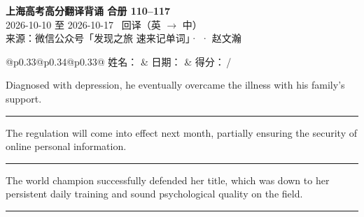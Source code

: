 \documentclass[11pt,a4paper]{article}
\newcommand{\num}[1]{\makebox[1.9em][r]{#1.}\hspace{0.3em}}
\newcommand{\wline}{\noindent\rule{\linewidth}{0.4pt}}
\begin{document}
\pagestyle{plain}
\begin{center}
{\LARGE\bfseries 上海高考高分翻译背诵 \quad 合册 110–117}\\[0.25em]
{\large 2026-10-10 至 2026-10-17 \quad\ 回译（英 $\to$ 中）}\\[0.35em]
{\footnotesize 来源：微信公众号「发现之旅 速来记单词」·  · 赵文瀚}
\end{center}

\vspace{0.4em}
\noindent\begin{tabular}{@{}p{0.33\textwidth}@{}p{0.34\textwidth}@{}p{0.33\textwidth}@{}}
姓名：\underline{\hspace{2.0cm}} & 日期：\underline{\hspace{2.0cm}} & 得分：\underline{\hspace{1.4cm}}\,/ \\
\end{tabular}

\vspace{0.5em}

\vspace{0.8em}
\vspace{0.35em}\vspace{0.15em}

\begin{minipage}{\linewidth}

\num{1}Diagnosed with depression, he eventually overcame the illness with his family’s support.

\vspace{0.25em}

\wline

\end{minipage}

\begin{minipage}{\linewidth}

\num{2}The regulation will come into effect next month, partially ensuring the security of online personal information.

\vspace{0.25em}

\wline

\end{minipage}

\begin{minipage}{\linewidth}

\num{3}The world champion successfully defended her title, which was down to her persistent daily training and sound psychological quality on the field.

\vspace{0.25em}

\wline

\end{minipage}
\end{document}
